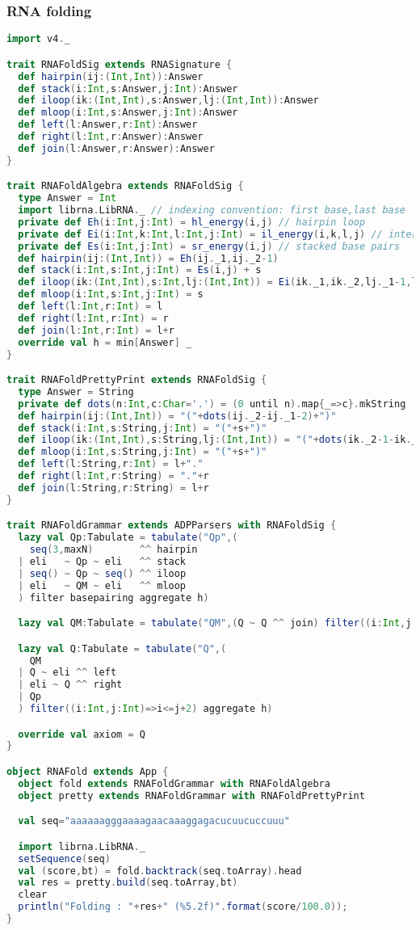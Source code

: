 \documentclass[11pt]{article}
\begin{document}
\subsubsection{RNA folding} \label{ex_rnafold}
\begin{lstlisting}[language=Scala,caption={RNA folding}]
import v4._

trait RNAFoldSig extends RNASignature {
  def hairpin(ij:(Int,Int)):Answer
  def stack(i:Int,s:Answer,j:Int):Answer
  def iloop(ik:(Int,Int),s:Answer,lj:(Int,Int)):Answer
  def mloop(i:Int,s:Answer,j:Int):Answer
  def left(l:Answer,r:Int):Answer
  def right(l:Int,r:Answer):Answer
  def join(l:Answer,r:Answer):Answer
}

trait RNAFoldAlgebra extends RNAFoldSig {
  type Answer = Int
  import librna.LibRNA._ // indexing convention: first base,last base
  private def Eh(i:Int,j:Int) = hl_energy(i,j) // hairpin loop
  private def Ei(i:Int,k:Int,l:Int,j:Int) = il_energy(i,k,l,j) // internal loop
  private def Es(i:Int,j:Int) = sr_energy(i,j) // stacked base pairs
  def hairpin(ij:(Int,Int)) = Eh(ij._1,ij._2-1)
  def stack(i:Int,s:Int,j:Int) = Es(i,j) + s
  def iloop(ik:(Int,Int),s:Int,lj:(Int,Int)) = Ei(ik._1,ik._2,lj._1-1,lj._2-1) + s
  def mloop(i:Int,s:Int,j:Int) = s
  def left(l:Int,r:Int) = l
  def right(l:Int,r:Int) = r
  def join(l:Int,r:Int) = l+r
  override val h = min[Answer] _
}

trait RNAFoldPrettyPrint extends RNAFoldSig {
  type Answer = String
  private def dots(n:Int,c:Char='.') = (0 until n).map{_=>c}.mkString
  def hairpin(ij:(Int,Int)) = "("+dots(ij._2-ij._1-2)+")"
  def stack(i:Int,s:String,j:Int) = "("+s+")"
  def iloop(ik:(Int,Int),s:String,lj:(Int,Int)) = "("+dots(ik._2-1-ik._1)+s+dots(lj._2-1-lj._1)+")"
  def mloop(i:Int,s:String,j:Int) = "("+s+")"
  def left(l:String,r:Int) = l+"."
  def right(l:Int,r:String) = "."+r
  def join(l:String,r:String) = l+r
}

trait RNAFoldGrammar extends ADPParsers with RNAFoldSig {
  lazy val Qp:Tabulate = tabulate("Qp",(
    seq(3,maxN)        ^^ hairpin
  | eli   ~ Qp ~ eli   ^^ stack
  | seq() ~ Qp ~ seq() ^^ iloop
  | eli   ~ QM ~ eli   ^^ mloop
  ) filter basepairing aggregate h)

  lazy val QM:Tabulate = tabulate("QM",(Q ~ Q ^^ join) filter((i:Int,j:Int)=>i<=j+4) aggregate h)

  lazy val Q:Tabulate = tabulate("Q",(
    QM
  | Q ~ eli ^^ left
  | eli ~ Q ^^ right
  | Qp
  ) filter((i:Int,j:Int)=>i<=j+2) aggregate h)

  override val axiom = Q
}

object RNAFold extends App {
  object fold extends RNAFoldGrammar with RNAFoldAlgebra
  object pretty extends RNAFoldGrammar with RNAFoldPrettyPrint

  val seq="aaaaaagggaaaagaacaaaggagacucuucuccuuu"

  import librna.LibRNA._
  setSequence(seq)
  val (score,bt) = fold.backtrack(seq.toArray).head
  val res = pretty.build(seq.toArray,bt)
  clear
  println("Folding : "+res+" (%5.2f)".format(score/100.0));
}
\end{lstlisting}
\end{document}
